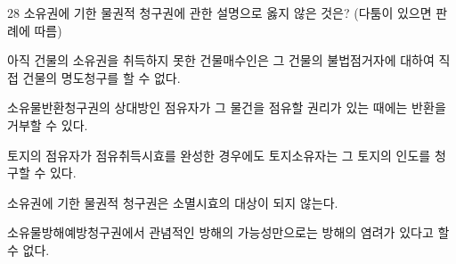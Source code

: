 \begin{question}{28}
소유권에 기한 물권적 청구권에 관한 설명으로 옳지 않은 것은? (다툼이 있으면 판례에 따름)
\begin{choices}
  \item 아직 건물의 소유권을 취득하지 못한 건물매수인은 그 건물의 불법점거자에 대하여 직접 건물의 명도청구를 할 수 없다.
  \item 소유물반환청구권의 상대방인 점유자가 그 물건을 점유할 권리가 있는 때에는 반환을 거부할 수 있다.
  \item 토지의 점유자가 점유취득시효를 완성한 경우에도 토지소유자는 그 토지의 인도를 청구할 수 있다.
  \item 소유권에 기한 물권적 청구권은 소멸시효의 대상이 되지 않는다.
  \item 소유물방해예방청구권에서 관념적인 방해의 가능성만으로는 방해의 염려가 있다고 할 수 없다.
\end{choices}
\end{question}
